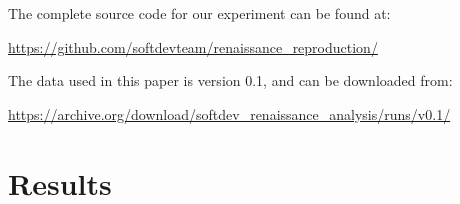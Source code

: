 \documentclass[a4paper]{article}
\begin{document}
\vspace{1em}
The complete source code for our experiment can be found at:
\begin{center}
\url{https://github.com/softdevteam/renaissance_reproduction/}
\end{center}

\vspace{1em}
The data used in this paper is version 0.1, and can be downloaded from:
\begin{center}
\url{https://archive.org/download/softdev_renaissance_analysis/runs/v0.1/}
\end{center}



\section{Results}
\label{sec:results}
\end{document}
